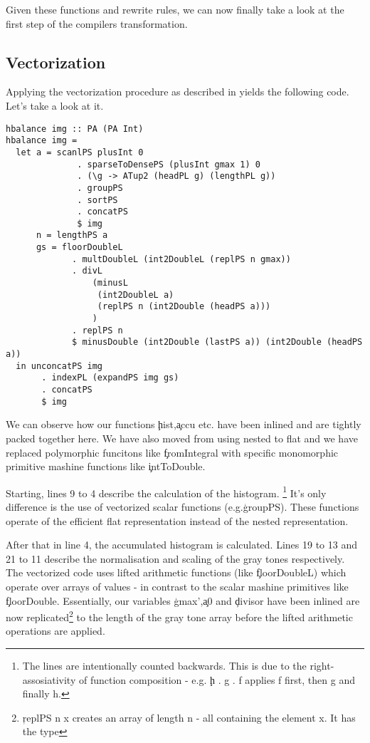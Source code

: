     Given these functions and rewrite rules, we can now finally take a look at the first step of the compilers transformation.
    
    \subsection{Vectorization}
      Applying the vectorization procedure as described in \cite{Harness2008} yields the following code. Let's take a look  at it.
      
      \begin{lstlisting}
hbalance img :: PA (PA Int)
hbalance img = 
  let a = scanlPS plusInt 0
              . sparseToDensePS (plusInt gmax 1) 0
              . (\g -> ATup2 (headPL g) (lengthPL g))
              . groupPS
              . sortPS
              . concatPS
              $ img
      n = lengthPS a
      gs = floorDoubleL
             . multDoubleL (int2DoubleL (replPS n gmax))
             . divL
                 (minusL
                  (int2DoubleL a)
                  (replPS n (int2Double (headPS a)))
                 )
             . replPS n
             $ minusDouble (int2Double (lastPS a)) (int2Double (headPS a))
  in unconcatPS img
       . indexPL (expandPS img gs)
       . concatPS
       $ img
      \end{lstlisting}
      We can observe how our functions \c{hist},\c{accu} etc. have been inlined and are tightly packed together here.
      We have also moved from using nested \pan to flat \pav and we have replaced polymorphic funcitons like \c{fromIntegral}
      with specific monomorphic primitive mashine functions like \c{intToDouble}.
      
      Starting, lines 9 to 4 describe the calculation of the histogram.
      \footnote[1]{The lines are intentionally counted backwards. This is due to the right-assosiativity of function composition - e.g. \c{h . g . f} applies f first, then g and finally h.}
      It's only difference is the use of vectorized scalar functions (e.g.\c{groupPS}). These functions operate of the efficient flat
      representation instead of the nested representation.
      
      
      After that in line 4, the accumulated histogram is calculated. Lines 19 to 13 and 21 to 11
      describe the normalisation and scaling of the gray tones respectively. The vectorized code uses
      lifted arithmetic functions (like \c{floorDoubleL}) which operate over arrays of values - in contrast to
      the scalar mashine primitives like \c{floorDouble}. Essentially, our variables \c{gmax'},\c{a0} and \c{divisor}
      have been inlined are now replicated\footnote[2]{\c{replPS n x} creates an array of length n - all containing the element x. It has the type }
      to the length of the gray tone array before the lifted arithmetic operations are applied.
      
